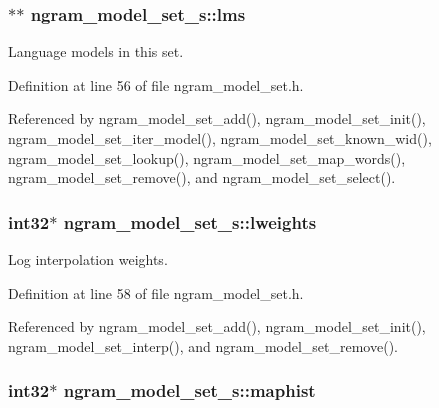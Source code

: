 \subsubsection[{lms}]{$\ast$$\ast$ ngram\+\_\+model\+\_\+set\+\_\+s\+::lms}\label{structngram__model__set__s_a862d4c4feb5a903101f4a0fdc5ba8a62}


Language models in this set. 



Definition at line 56 of file ngram\+\_\+model\+\_\+set.\+h.



Referenced by ngram\+\_\+model\+\_\+set\+\_\+add(), ngram\+\_\+model\+\_\+set\+\_\+init(), ngram\+\_\+model\+\_\+set\+\_\+iter\+\_\+model(), ngram\+\_\+model\+\_\+set\+\_\+known\+\_\+wid(), ngram\+\_\+model\+\_\+set\+\_\+lookup(), ngram\+\_\+model\+\_\+set\+\_\+map\+\_\+words(), ngram\+\_\+model\+\_\+set\+\_\+remove(), and ngram\+\_\+model\+\_\+set\+\_\+select().

\subsubsection[{lweights}]{\setlength{\rightskip}{0pt plus 5cm}int32$\ast$ ngram\+\_\+model\+\_\+set\+\_\+s\+::lweights}\label{structngram__model__set__s_a11068bb0029c788c506bec4507dd6d23}


Log interpolation weights. 



Definition at line 58 of file ngram\+\_\+model\+\_\+set.\+h.



Referenced by ngram\+\_\+model\+\_\+set\+\_\+add(), ngram\+\_\+model\+\_\+set\+\_\+init(), ngram\+\_\+model\+\_\+set\+\_\+interp(), and ngram\+\_\+model\+\_\+set\+\_\+remove().

\subsubsection[{maphist}]{\setlength{\rightskip}{0pt plus 5cm}int32$\ast$ ngram\+\_\+model\+\_\+set\+\_\+s\+::maphist}\label{structngram__model__set__s_af34ca232338c2d8c7dc8d13869ac09fd}


